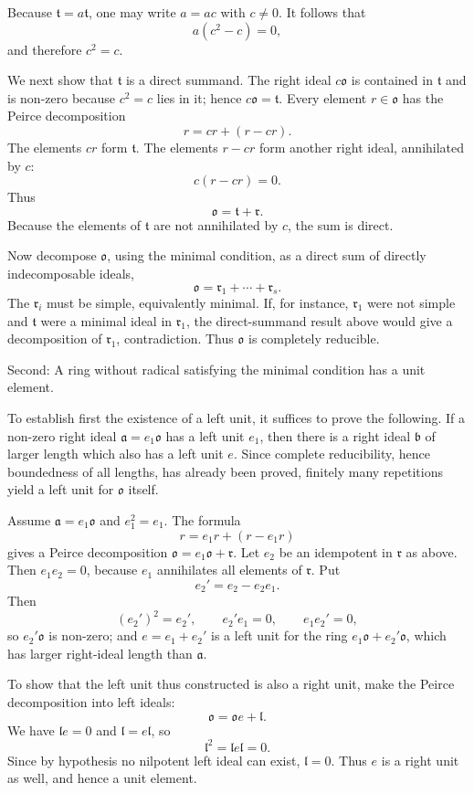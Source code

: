 \documentclass[
  11pt,
]{article}
\begin{document}
Because \(\mathfrak t=a\mathfrak t\), one may write \(a=ac\) with
\(c\ne0\). It follows that \[
  a(c^2-c)=0,
\] and therefore \(c^2=c\).

We next show that \(\mathfrak t\) is a direct summand. The right ideal
\(c\mathfrak{o}\) is contained in \(\mathfrak t\) and is non-zero
because \(c^2=c\) lies in it; hence \(c\mathfrak{o}=\mathfrak t\). Every
element \(r\in\mathfrak{o}\) has the Peirce decomposition \[
  r=cr+(r-cr).
\] The elements \(cr\) form \(\mathfrak t\). The elements \(r-cr\) form
another right ideal, annihilated by \(c\): \[
  c(r-cr)=0.
\] Thus \[
  \mathfrak{o}=\mathfrak t+\mathfrak r.
\] Because the elements of \(\mathfrak t\) are not annihilated by \(c\),
the sum is direct.

Now decompose \(\mathfrak{o}\), using the minimal condition, as a direct
sum of directly indecomposable ideals, \[
  \mathfrak{o}=\mathfrak r_1+\cdots+\mathfrak r_s.
\] The \(\mathfrak r_i\) must be simple, equivalently minimal. If, for
instance, \(\mathfrak r_1\) were not simple and \(\mathfrak t\) were a
minimal ideal in \(\mathfrak r_1\), the direct-summand result above
would give a decomposition of \(\mathfrak r_1\), contradiction. Thus
\(\mathfrak{o}\) is completely reducible.

Second: A ring without radical satisfying the minimal condition has a
unit element.

To establish first the existence of a left unit, it suffices to prove
the following. If a non-zero right ideal \(\mathfrak a=e_1\mathfrak{o}\)
has a left unit \(e_1\), then there is a right ideal \(\mathfrak b\) of
larger length which also has a left unit \(e\). Since complete
reducibility, hence boundedness of all lengths, has already been proved,
finitely many repetitions yield a left unit for \(\mathfrak{o}\) itself.

Assume \(\mathfrak a=e_1\mathfrak{o}\) and \(e_1^2=e_1\). The formula \[
  r=e_1r+(r-e_1r)
\] gives a Peirce decomposition
\(\mathfrak{o}=e_1\mathfrak{o}+\mathfrak r\). Let \(e_2\) be an
idempotent in \(\mathfrak r\) as above. Then \(e_1e_2=0\), because
\(e_1\) annihilates all elements of \(\mathfrak r\). Put \[
  e_2'=e_2-e_2e_1.
\] Then \[
  (e_2')^2=e_2',
  \qquad
  e_2'e_1=0,
  \qquad
  e_1e_2'=0,
\] so \(e_2'\mathfrak{o}\) is non-zero; and \(e=e_1+e_2'\) is a left
unit for the ring \(e_1\mathfrak{o}+e_2'\mathfrak{o}\), which has larger
right-ideal length than \(\mathfrak a\).

To show that the left unit thus constructed is also a right unit, make
the Peirce decomposition into left ideals: \[
  \mathfrak{o}=\mathfrak{o}e+\mathfrak l.
\] We have \(\mathfrak l e=0\) and \(\mathfrak l=e\mathfrak l\), so \[
  \mathfrak l^2=\mathfrak l e\mathfrak l=0.
\] Since by hypothesis no nilpotent left ideal can exist,
\(\mathfrak l=0\). Thus \(e\) is a right unit as well, and hence a unit
element.
\end{document}
